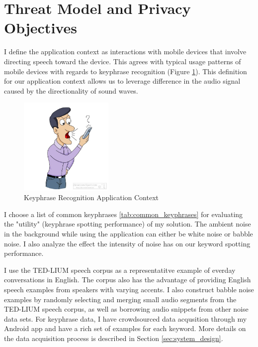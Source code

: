 
\section{Threat Model and Privacy Objectives}
\label{sec:threat_model}

I define the application context as interactions with mobile devices that involve directing speech toward the device.
 This agrees with typical usage patterns of mobile devices with regards to keyphrase recognition (Figure \ref{fig:keyphrase_application_context}).
 This definition for our application context allows us to leverage difference in the audio signal caused by the directionality of sound waves. 

\begin{figure}[!th]
\centering
\includegraphics[width=0.4\textwidth]{sound/talking-into-cell-phone.jpg}
\caption{Keyphrase Recognition Application Context}
\label{fig:keyphrase_application_context}
\end{figure}




I choose a list of common keyphrases \ref{tab:common_keyphrases} for evaluating the "utility" (keyphrase spotting performance) of my solution.
 The ambient noise in the background while using the application can either be white noise or babble noise.
 I also analyze the effect the intensity of noise has on our keyword spotting performance.

I use the TED-LIUM speech corpus \cite{TEDLIUMCorpus} as a representatitve example of everday conversations in English.
 The corpus also has the advantage of providing English speech examples from speakers with varying accents.
 I also construct babble noise examples by randomly selecting and merging small audio segments from the TED-LIUM speech corpus, as well as borrowing audio snippets from other noise data sets.
 For keyphrase data, I have crowdsourced data acqusition through my Android app and have a rich set of examples for each keyword.
 More details on the data acquisition process is described in Section \ref{sec:system_design}.



